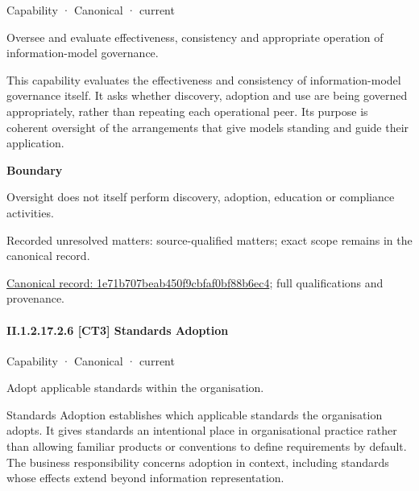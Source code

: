 \label{element:1e71b707beab450f9cbfaf0bf88b6ec4}
{\small Capability · Canonical · current}\par

Oversee and evaluate effectiveness, consistency and appropriate operation of information-model governance.



This capability evaluates the effectiveness and consistency of information-model governance itself. It asks whether discovery, adoption and use are being governed appropriately, rather than repeating each operational peer. Its purpose is coherent oversight of the arrangements that give models standing and guide their application.



\textbf{Boundary}



Oversight does not itself perform discovery, adoption, education or compliance activities.


{\small Recorded unresolved matters: source-qualified matters; exact scope remains in the canonical record.}\par
{\footnotesize \href{../../../../../../../continuum/strategy/capability/1e71b707beab450f9cbfaf0bf88b6ec4.md}{Canonical record: 1e71b707beab450f9cbfaf0bf88b6ec4}; full qualifications and provenance.}\par
\paragraph*{II.1.2.17.2.6 [CT3] Standards Adoption}
\label{navigation:II.1.2.17.2.6}

\label{element:0d59f956f5714d3985398f09aeb7c541}
{\small Capability · Canonical · current}\par

Adopt applicable standards within the organisation.



Standards Adoption establishes which applicable standards the organisation adopts. It gives standards an intentional place in organisational practice rather than allowing familiar products or conventions to define requirements by default. The business responsibility concerns adoption in context, including standards whose effects extend beyond information representation.



